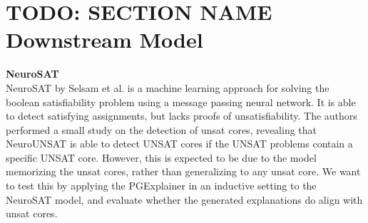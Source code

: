 \section{TODO: SECTION NAME Downstream Model}
\label{sec:Downstream_Models}

\textbf{NeuroSAT} \\
NeuroSAT by Selsam et al. \cite{selsam2018learning} is a machine learning approach for solving the boolean satisfiability problem using a message passing neural network. It is able to detect satisfying assignments, but lacks proofs of unsatisfiability. The authors performed a small study on the detection of unsat cores, revealing that NeuroUNSAT is able to detect UNSAT cores if the UNSAT problems contain a specific UNSAT core. However, this is expected to be due to the model memorizing the unsat cores, rather than generalizing to any unsat core. We want to test this by applying the PGExplainer in an inductive setting to the NeuroSAT model, and evaluate whether the generated explanations do align with unsat cores.